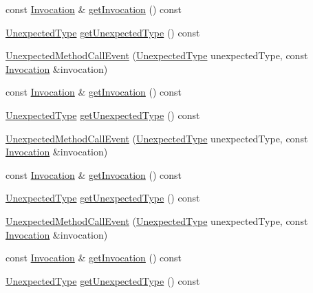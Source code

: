 \begin{DoxyCompactItemize}
const \mbox{\hyperlink{structfakeit_1_1Invocation}{Invocation}} \& \mbox{\hyperlink{structfakeit_1_1UnexpectedMethodCallEvent_a80a3e753a6163cecbb4d6f1b75a03f9f}{get\+Invocation}} () const
\item 
\mbox{\hyperlink{namespacefakeit_ae284671dc00c0fa5ee2aa4a6af02743b}{Unexpected\+Type}} \mbox{\hyperlink{structfakeit_1_1UnexpectedMethodCallEvent_a85b14cb613e543dff7e3c491f643ad7b}{get\+Unexpected\+Type}} () const
\item 
\mbox{\hyperlink{structfakeit_1_1UnexpectedMethodCallEvent_a57007d208f8ad119bbc5fedb744440cc}{Unexpected\+Method\+Call\+Event}} (\mbox{\hyperlink{namespacefakeit_ae284671dc00c0fa5ee2aa4a6af02743b}{Unexpected\+Type}} unexpected\+Type, const \mbox{\hyperlink{structfakeit_1_1Invocation}{Invocation}} \&invocation)
\item 
const \mbox{\hyperlink{structfakeit_1_1Invocation}{Invocation}} \& \mbox{\hyperlink{structfakeit_1_1UnexpectedMethodCallEvent_a80a3e753a6163cecbb4d6f1b75a03f9f}{get\+Invocation}} () const
\item 
\mbox{\hyperlink{namespacefakeit_ae284671dc00c0fa5ee2aa4a6af02743b}{Unexpected\+Type}} \mbox{\hyperlink{structfakeit_1_1UnexpectedMethodCallEvent_a85b14cb613e543dff7e3c491f643ad7b}{get\+Unexpected\+Type}} () const
\item 
\mbox{\hyperlink{structfakeit_1_1UnexpectedMethodCallEvent_a57007d208f8ad119bbc5fedb744440cc}{Unexpected\+Method\+Call\+Event}} (\mbox{\hyperlink{namespacefakeit_ae284671dc00c0fa5ee2aa4a6af02743b}{Unexpected\+Type}} unexpected\+Type, const \mbox{\hyperlink{structfakeit_1_1Invocation}{Invocation}} \&invocation)
\item 
const \mbox{\hyperlink{structfakeit_1_1Invocation}{Invocation}} \& \mbox{\hyperlink{structfakeit_1_1UnexpectedMethodCallEvent_a80a3e753a6163cecbb4d6f1b75a03f9f}{get\+Invocation}} () const
\item 
\mbox{\hyperlink{namespacefakeit_ae284671dc00c0fa5ee2aa4a6af02743b}{Unexpected\+Type}} \mbox{\hyperlink{structfakeit_1_1UnexpectedMethodCallEvent_a85b14cb613e543dff7e3c491f643ad7b}{get\+Unexpected\+Type}} () const
\item 
\mbox{\hyperlink{structfakeit_1_1UnexpectedMethodCallEvent_a57007d208f8ad119bbc5fedb744440cc}{Unexpected\+Method\+Call\+Event}} (\mbox{\hyperlink{namespacefakeit_ae284671dc00c0fa5ee2aa4a6af02743b}{Unexpected\+Type}} unexpected\+Type, const \mbox{\hyperlink{structfakeit_1_1Invocation}{Invocation}} \&invocation)
\item 
const \mbox{\hyperlink{structfakeit_1_1Invocation}{Invocation}} \& \mbox{\hyperlink{structfakeit_1_1UnexpectedMethodCallEvent_a80a3e753a6163cecbb4d6f1b75a03f9f}{get\+Invocation}} () const
\item 
\mbox{\hyperlink{namespacefakeit_ae284671dc00c0fa5ee2aa4a6af02743b}{Unexpected\+Type}} \mbox{\hyperlink{structfakeit_1_1UnexpectedMethodCallEvent_a85b14cb613e543dff7e3c491f643ad7b}{get\+Unexpected\+Type}} () const
\end{DoxyCompactItemize}
